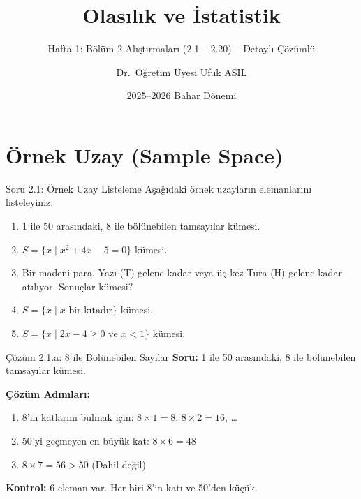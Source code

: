 \documentclass[light]{lutbeamer}
\institute[Yazılım Mühendisliği]{YAZILIM MÜHENDİSLİĞİ BÖLÜMÜ}
\author{Dr.~Öğretim Üyesi Ufuk ASIL}
\title{Olasılık ve İstatistik}
\subtitle{Hafta 1: Bölüm 2 Alıştırmaları (2.1 -- 2.20) -- Detaylı Çözümlü}
\date{2025--2026 Bahar Dönemi}
\begin{document}
\maketitle{}

\section{Örnek Uzay (Sample Space)}

\begin{frame}{Soru 2.1: Örnek Uzay Listeleme}
    Aşağıdaki örnek uzayların elemanlarını listeleyiniz:
    \begin{enumerate}
        \item 1 ile 50 arasındaki, 8 ile bölünebilen tamsayılar kümesi.
        \item $S = \{x \mid x^2 + 4x - 5 = 0\}$ kümesi.
        \item Bir madeni para, Yazı (T) gelene kadar veya üç kez Tura (H) gelene kadar atılıyor. Sonuçlar kümesi?
        \item $S = \{x \mid x \text{ bir kıtadır}\}$ kümesi.
        \item $S = \{x \mid 2x - 4 \geq 0 \text{ ve } x < 1\}$ kümesi.
    \end{enumerate}
\end{frame}

\begin{frame}[fragile]{Çözüm 2.1.a: 8 ile Bölünebilen Sayılar}
    \color{blue}
    \textbf{Soru:} 1 ile 50 arasındaki, 8 ile bölünebilen tamsayılar kümesi.
    
    \vspace{0.3cm}
    \textbf{Çözüm Adımları:}
    \begin{enumerate}
        \item 8'in katlarını bulmak için: $8 \times 1 = 8$, $8 \times 2 = 16$, \dots
        \item 50'yi geçmeyen en büyük kat: $8 \times 6 = 48$
        \item $8 \times 7 = 56 > 50$ (Dahil değil)
    \end{enumerate}
    
    \vspace{0.3cm}
    \begin{center}
    \end{center}
    
    \textbf{Kontrol:} 6 eleman var. Her biri 8'in katı ve 50'den küçük.
\end{frame}
\end{document}
